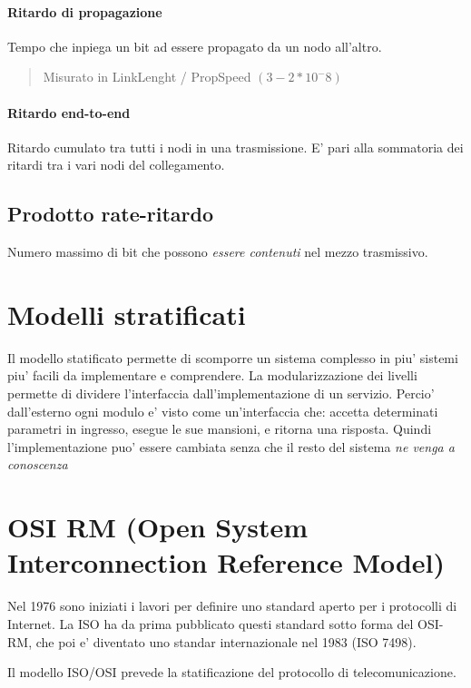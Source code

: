 \paragraph{Ritardo di propagazione}
Tempo che inpiega un bit ad essere propagato da un nodo all'altro.
\begin{quote}
    Misurato in LinkLenght / PropSpeed $(3-2*10^-8)$
\end{quote}
\paragraph{Ritardo end-to-end}
Ritardo cumulato tra tutti i nodi in una trasmissione. E' pari alla sommatoria dei ritardi tra i vari nodi del collegamento.
\subsection{Prodotto rate-ritardo}
Numero massimo di bit che possono \textit{essere contenuti} nel mezzo trasmissivo.
\newpage 
\section{Modelli stratificati}
Il modello statificato permette di scomporre un sistema complesso in piu' sistemi piu' facili da implementare e comprendere.
La modularizzazione dei livelli permette di dividere l'interfaccia dall'implementazione di un servizio.
Percio' dall'esterno ogni modulo e' visto come un'interfaccia che: accetta determinati parametri in ingresso, esegue le sue mansioni, e ritorna una risposta.
Quindi l'implementazione puo' essere cambiata senza che il resto del sistema \textit{ne venga a conoscenza}
\section{OSI RM \small(Open System Interconnection Reference Model)}
Nel 1976 sono iniziati i lavori per definire uno standard aperto per i protocolli di Internet.
La ISO ha da prima pubblicato questi standard sotto forma del OSI-RM, che poi e' diventato uno standar internazionale nel 1983 (ISO 7498).

Il modello ISO/OSI prevede la statificazione del protocollo di telecomunicazione.

